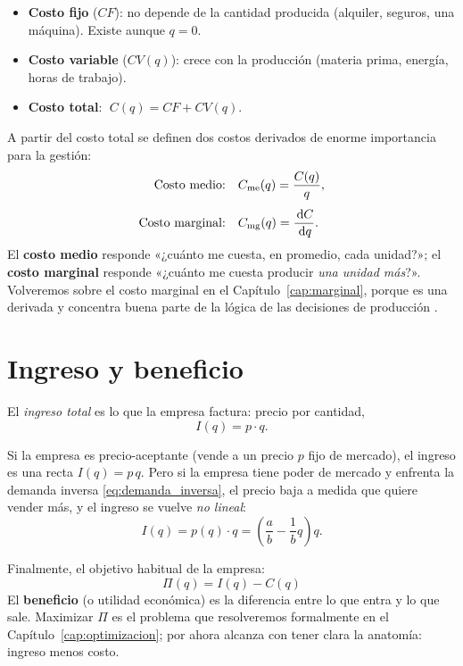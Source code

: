\begin{itemize}
  \item \textbf{Costo fijo} ($CF$): no depende de la cantidad producida (alquiler, seguros, una máquina). Existe aunque $q=0$.
  \item \textbf{Costo variable} ($CV(q)$): crece con la producción (materia prima, energía, horas de trabajo).
  \item \textbf{Costo total}: $\;C(q) = CF + CV(q)$.
\end{itemize}

A partir del costo total se definen dos costos derivados de enorme importancia para la gestión:
\begin{align}
\text{Costo medio:}\quad & C_{\mathrm{me}}(q) = \frac{C(q)}{q}, \label{eq:cme}\\[4pt]
\text{Costo marginal:}\quad & C_{\mathrm{mg}}(q) = \frac{\,\mathrm{d} C}{\,\mathrm{d} q}. \label{eq:cmg}
\end{align}
El \textbf{costo medio} responde «¿cuánto me cuesta, en promedio, cada unidad?»; el \textbf{costo marginal} responde «¿cuánto me cuesta producir \emph{una unidad más}?». Volveremos sobre el costo marginal en el Capítulo~\ref{cap:marginal}, porque es una derivada y concentra buena parte de la lógica de las decisiones de producción \cite{nicholson}.

\section{Ingreso y beneficio}

\begin{definicion}
El \emph{ingreso total} es lo que la empresa factura: precio por cantidad,
\[
I(q) = p \cdot q.
\]
\end{definicion}

Si la empresa es precio-aceptante (vende a un precio $p$ fijo de mercado), el ingreso es una recta $I(q)=p\,q$. Pero si la empresa tiene poder de mercado y enfrenta la demanda inversa \eqref{eq:demanda_inversa}, el precio baja a medida que quiere vender más, y el ingreso se vuelve \emph{no lineal}:
\begin{equation}
I(q) = p(q)\cdot q = \left(\frac{a}{b} - \frac{1}{b}q\right) q .
\label{eq:ingreso}
\end{equation}

Finalmente, el objetivo habitual de la empresa:
\begin{equation}
\boxed{\;\Pi(q) = I(q) - C(q)\;}
\label{eq:beneficio}
\end{equation}
El \textbf{beneficio} (o utilidad económica) es la diferencia entre lo que entra y lo que sale. Maximizar $\Pi$ es el problema que resolveremos formalmente en el Capítulo~\ref{cap:optimizacion}; por ahora alcanza con tener clara la anatomía: ingreso menos costo.

